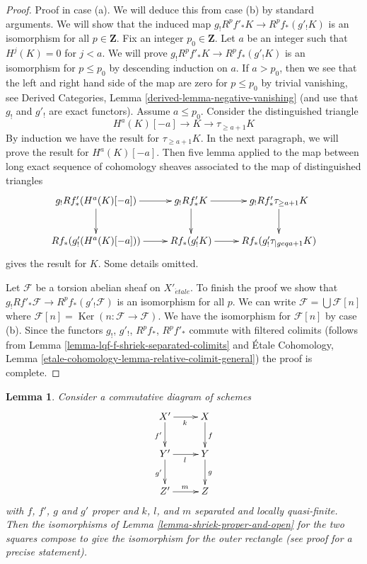 \documentclass{stacks-project}
\theoremstyle{plain}
\newtheorem{lemma}[subsection]{Lemma}
\theoremstyle{definition}
\theoremstyle{remark}
\numberwithin{equation}{subsection}
\def\etale{{\acute{e}tale}}
\def\Ker{\mathop{\mathrm{Ker}}}
\begin{document}
\begin{proof}
\medskip\noindent
Proof in case (a). We will deduce this from case (b) by standard arguments.
We will show that the induced map $g_! R^pf'_* K \to R^pf_*(g'_!K)$
is an isomorphism for all $p \in \mathbf{Z}$. Fix an integer
$p_0 \in \mathbf{Z}$. Let $a$ be an integer such that $H^j(K) = 0$
for $j < a$. We will prove $g_! R^pf'_* K \to R^pf_*(g'_!K)$
is an isomorphism for $p \leq p_0$ by descending induction on $a$. If
$a > p_0$, then we see that the left and right hand side of
the map are zero for $p \leq p_0$ by trivial vanishing, see
Derived Categories, Lemma \ref{derived-lemma-negative-vanishing}
(and use that $g_!$ and $g'_!$ are exact functors).
Assume $a \leq p_0$. Consider the distinguished triangle
$$
H^a(K)[-a] \to K \to \tau_{\geq a + 1}K
$$
By induction we have the result for $\tau_{\geq a + 1}K$.
In the next paragraph, we will prove the result for $H^a(K)[-a]$.
Then five lemma applied to the map between
long exact sequence of cohomology sheaves
associated to the map of distinguished triangles
$$
\xymatrix{
g_! Rf'_*(H^a(K)[-a]) \ar[d] \ar[r] &
g_! Rf'_* K \ar[r] \ar[d] &
g_! Rf'_* \tau_{\geq a + 1} K \ar[d] \\
Rf_*(g'_!(H^a(K)[-a])) \ar[r] &
Rf_*(g'_!K) \ar[r] &
Rf_*(g'_!\tau_{|geq a + 1}K)
}
$$
gives the result for $K$. Some details omitted.

\medskip\noindent
Let $\mathcal{F}$ be a torsion abelian sheaf on $X'_\etale$.
To finish the proof we show that
$g_! Rf'_*\mathcal{F} \to R^pf_*(g'_!\mathcal{F})$
is an isomorphism for all $p$.
We can write $\mathcal{F} = \bigcup \mathcal{F}[n]$ where
$\mathcal{F}[n] = \Ker(n : \mathcal{F} \to \mathcal{F})$.
We have the isomorphism for $\mathcal{F}[n]$ by case (b).
Since the functors $g_!$, $g'_!$, $R^pf_*$, $R^pf'_*$ commute
with filtered colimits (follows from
Lemma \ref{lemma-lqf-f-shriek-separated-colimits} and
\'Etale Cohomology, Lemma
\ref{etale-cohomology-lemma-relative-colimit-general})
the proof is complete.
\end{proof}

\begin{lemma}
\label{lemma-shriek-proper-and-open-compose}
Consider a commutative diagram of schemes
$$
\xymatrix{
X' \ar[r]_k \ar[d]_{f'} & X \ar[d]^f \\
Y' \ar[r]_l \ar[d]_{g'} & Y \ar[d]^g \\
Z' \ar[r]^m & Z
}
$$
with $f$, $f'$, $g$ and $g'$ proper and
$k$, $l$, and $m$ separated and locally quasi-finite.
Then the isomorphisms of Lemma \ref{lemma-shriek-proper-and-open}
for the two squares compose to give the isomorphism
for the outer rectangle (see proof for a precise statement).
\end{lemma}
\end{document}
